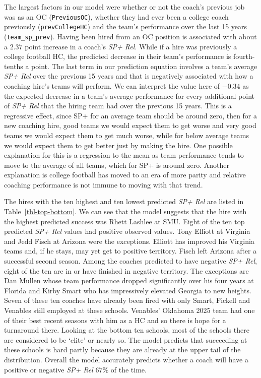 \documentclass[
  12pt]{article}
\begin{document}
The largest factors in our model were whether or not the coach's
previous job was as an OC (\texttt{PreviousOC}), whether they had ever
been a college coach previously (\texttt{prevCollegeHC}) and the team's
performance over the last 15 years (\texttt{team\_sp\_prev}). Having
been hired from an OC position is associated with about a \(2.37\) point
increase in a coach's \emph{SP+ Rel}. While if a hire was previously a
college football HC, the predicted decrease in their team's performance
is fourth-tenths a point. The last term in our prediction equation
involves a team's average \emph{SP+ Rel} over the previous 15 years and
that is negatively associated with how a coaching hire's teams will
perform. We can interpret the value here of \(-0.34\) as the expected
decrease in a team's average performance for every additional point of
\emph{SP+ Rel} that the hiring team had over the previous 15 years. This
is a regressive effect, since SP+ for an average team should be around
zero, then for a new coaching hire, good teams we would expect them to
get worse and very good teams we would expect them to get much worse,
while for below average teams we would expect them to get better just by
making the hire. One possible explanation for this is a regression to
the mean as team performance tends to move to the average of all teams,
which for SP+ is around zero. Another explanation is college football
has moved to an era of more parity and relative coaching performance is
not immune to moving with that trend.

The hires with the ten highest and ten lowest predicted \emph{SP+ Rel}
are listed in Table~\ref{tbl-top-bottom}. We can see that the model
suggests that the hire with the highest predicted success was Rhett
Lashlee at SMU. Eight of the ten top predicted \emph{SP+ Rel} values had
positive observed values. Tony Elliott at Virginia and Jedd Fisch at
Arizona were the exceptions. Elliott has improved his Virginia teams
and, if he stays, may yet get to positive territory. Fisch left Arizona
after a successful second season. Among the coaches predicted to have
negative \emph{SP+ Rel}, eight of the ten are in or have finished in
negative territory. The exceptions are Dan Mullen whose team performance
dropped significantly over his four years at Florida and Kirby Smart who
has impressively elevated Georgia to new heights. Seven of these ten
coaches have already been fired with only Smart, Fickell and Venables
still employed at these schools. Venables' Oklahoma 2025 team had one of
their best recent seasons with him as a HC and so there is hope for a
turnaround there. Looking at the bottom ten schools, most of the schools
there are considered to be `elite' or nearly so. The model predicts that
succeeding at these schools is hard partly because they are already at
the upper tail of the distribution. Overall the model accurately
predicts whether a coach will have a positive or negative \emph{SP+ Rel}
67\% of the time.
\end{document}

